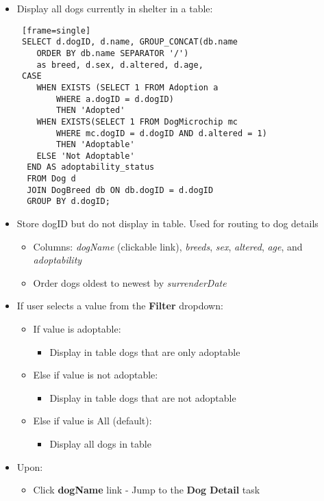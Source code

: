\documentclass{article}
\begin{document}
\begin{itemize}
    \item Display all dogs currently in shelter in a table:
    \begin{Verbatim} [frame=single]
 SELECT d.dogID, d.name, GROUP_CONCAT(db.name 
    ORDER BY db.name SEPARATOR '/') 
    as breed, d.sex, d.altered, d.age,
 CASE 
    WHEN EXISTS (SELECT 1 FROM Adoption a 
        WHERE a.dogID = d.dogID) 
        THEN 'Adopted'
    WHEN EXISTS(SELECT 1 FROM DogMicrochip mc 
        WHERE mc.dogID = d.dogID AND d.altered = 1)
        THEN 'Adoptable'
    ELSE 'Not Adoptable'
  END AS adoptability_status
  FROM Dog d
  JOIN DogBreed db ON db.dogID = d.dogID
  GROUP BY d.dogID;
    \end{Verbatim}
    \item Store dogID but do not display in table. Used for routing to dog details
    \begin{itemize}
        \item Columns: \textit{dogName} (clickable link), \textit{breeds}, \textit{sex}, \textit{altered}, \textit{age}, and \textit{adoptability}
        \item Order dogs oldest to newest by \textit{surrenderDate}
    \end{itemize}
    \item If user selects a value from the \textbf{Filter} dropdown:
    \begin{itemize}
        \item If value is adoptable:
        \begin{itemize}
            \item Display in table dogs that are only adoptable
        \end{itemize}
        \item Else if value is not adoptable:
        \begin{itemize}
            \item Display in table dogs that are not adoptable
        \end{itemize}
        \item Else if value is All (default):
        \begin{itemize}
            \item Display all dogs in table
        \end{itemize}
    \end{itemize}
    \item Upon:
    \begin{itemize}
        \item Click \textbf{dogName} link - Jump to the \textbf{Dog Detail} task

\end{itemize}
\end{itemize}
\end{document}
